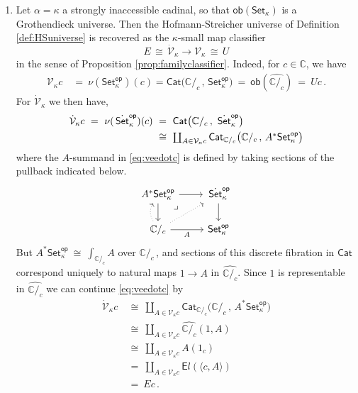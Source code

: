 \documentclass[11pt,reqno]{amsart}
\newcommand{\bbC}{\ensuremath{\mathbb{C}}}
\newcommand{\Set}{\ensuremath{\mathsf{Set}}}
\newcommand{\Cat}{\ensuremath{\mathsf{Cat}}}
\renewcommand{\to}{\ensuremath{\rightarrow}}
\newcommand{\too}{\ensuremath{\longrightarrow}}
\newcommand{\V}{\ensuremath{\mathcal{V}}}
\newcommand{\VV}{\ensuremath{\dot{\mathcal{V}}}}
\newcommand{\SSet}{\ensuremath{\,\dot{\Set}}}
\theoremstyle{remark}
\theoremstyle{definition}
\newcommand{\pbmark}{\ar[dr, phantom, "\lrcorner" very near start, shift right=.5ex]}	%
\begin{document}
\begin{enumerate}
%
\item Let $\alpha = \kappa$ a strongly inaccessible cadinal, so that $\mathsf{ob}({\Set_\kappa})$ is a Grothendieck universe.  Then the Hofmann-Streicher universe of Definition \ref{def:HSuniverse} is recovered as the $\kappa$-small map classifier
\begin{equation*}
E\, \cong\, \VV_\kappa \too \V_\kappa\, \cong\, U
\end{equation*}
 in the sense of Proposition \ref{prop:familyclassifier}.  Indeed, for $c\in\bbC$, we have 
 \begin{align}
  \V_{\kappa}{c}\ &=\ \nu(\Set^{\mathsf{op}}_\kappa)(c) = \Cat\big( {\bbC/_c}\,,\, \Set^{\mathsf{op}}_\kappa \big)\  =\ \mathsf{ob}(\widehat{\bbC/_c})\ =\ U{c} \,.
   \end{align} 
For $\VV_{\kappa}$ we then have,
   \begin{align}\label{eq:veedotc}
   \VV_{\kappa}{c}\ =\ \nu(\SSet^{\mathsf{op}}_\kappa)(c)\ &=\ \Cat\big( {\bbC/_c}\,,\, \SSet^{\mathsf{op}}_\kappa \big) \notag \\ 
   &\cong\ {\textstyle \coprod_{A\in\V_{\kappa}{c}}\Cat_{{\bbC/_c}}\big( {\bbC/_c}\,,\, A^*\Set^{\mathsf{op}}_\kappa \big)}
   \end{align}
   where the $A$-summand in \eqref{eq:veedotc} is defined by taking sections of the  pullback indicated below.
   \begin{equation}\label{eq:pbforindexing}\textstyle
\begin{tikzcd}
	A^*\Set^{\mathsf{op}}_\kappa \ar[d] \ar[r] \pbmark & \SSet^{\mathsf{op}}_\kappa \ar[d]\\  
	\bbC/_c \ar[r,swap,"A"] \ar[u, bend left, dotted] \ar[ur, dotted] &  \Set^{\mathsf{op}}_\kappa
 \end{tikzcd}
 \end{equation}
 But $A^*\Set^{\mathsf{op}}_\kappa\ \cong\ {\textstyle \int_{\bbC/_c}\!A}$ over $\bbC/_c\,$, and sections of this discrete fibration in $\Cat$ correspond uniquely to natural maps $1\to A$ in $\widehat{{\bbC/_c}}$.  Since $1$  is representable in $\widehat{{\bbC/_c}}$ we can continue \eqref{eq:veedotc} by
  \begin{align*}
   \VV_{\kappa}{c}\ &\cong\ {\textstyle \coprod_{A\in \V_{\kappa}{c}}\Cat_{{\bbC/_c}}\big( {\bbC/_c}\,,\, A^*\Set^{\mathsf{op}}_\kappa \big)}\\
   	&\cong\ {\textstyle \coprod_{A\in \V_{\kappa}{c}} \widehat{{\bbC/_c}}(1, A)}\\
	&\cong\ {\textstyle \coprod_{A\in \V_{\kappa}{c}} A(1_c) } \\
	& =\ {\textstyle \coprod_{A\in \V_{\kappa}{c}} {\mathsf{E}l}(\langle c, A\rangle)}\\
	& =\  E c\,.
   \end{align*}
 

\end{enumerate}
\end{document}
